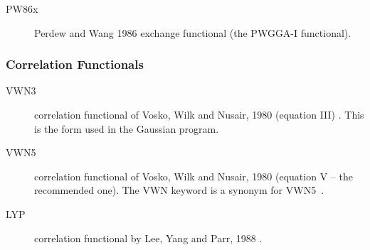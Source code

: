 \begin{description}
\begin{description}


\item[PW86x] Perdew and Wang 1986 exchange functional (the PWGGA-I functional)\cite{dft:pw86x}.



\end{description}

\subsubsection{Correlation Functionals}
\providecommand\corfn[1]{#1}
\begin{description}

\item[VWN3] correlation functional of Vosko, Wilk and Nusair, 1980 (equation III) 
  \cite{dft:vwn}. This is the form used in the Gaussian program.

\item[VWN5] correlation functional of Vosko, Wilk and Nusair, 1980 (equation
  V -- the recommended one). The VWN keyword is a synonym for VWN5~\cite{dft:vwn}.


\item[LYP] correlation functional by Lee, Yang and Parr, 1988
  \cite{dft:lyp1,dft:lyp2}.



\end{description}
\end{description}
